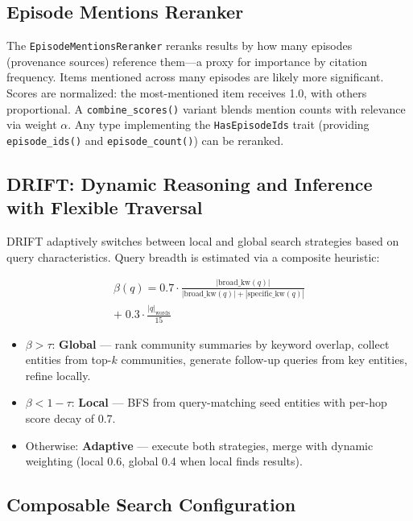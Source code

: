 \documentclass[11pt,a4paper,twocolumn]{article}
\begin{document}
\subsection{Episode Mentions Reranker}
\label{sec:epmention}

The \texttt{EpisodeMentionsReranker} reranks results by how many
episodes (provenance sources) reference them---a proxy for
importance by citation frequency. Items mentioned across many
episodes are likely more significant. Scores are normalized:
the most-mentioned item receives 1.0, with others proportional.
A \texttt{combine\_scores()} variant blends mention counts with
relevance via weight $\alpha$. Any type implementing the
\texttt{HasEpisodeIds} trait (providing \texttt{episode\_ids()}
and \texttt{episode\_count()}) can be reranked.

\subsection{DRIFT: Dynamic Reasoning and Inference with Flexible Traversal}

DRIFT adaptively switches between local and global search strategies
based on query characteristics. Query breadth is estimated via a
composite heuristic:

\begin{multline}
\beta(q) = 0.7 \cdot \frac{|\text{broad\_kw}(q)|}{|\text{broad\_kw}(q)|
  + |\text{specific\_kw}(q)|} \\
  + \; 0.3 \cdot \frac{|q|_{\text{words}}}{15}
\end{multline}

\begin{itemize}[leftmargin=*]
  \item $\beta > \tau$: \textbf{Global} --- rank community summaries
    by keyword overlap, collect entities from top-$k$ communities,
    generate follow-up queries from key entities, refine locally.
  \item $\beta < 1 - \tau$: \textbf{Local} --- BFS from query-matching
    seed entities with per-hop score decay of 0.7.
  \item Otherwise: \textbf{Adaptive} --- execute both strategies,
    merge with dynamic weighting (local 0.6, global 0.4 when local
    finds results).
\end{itemize}

\subsection{Composable Search Configuration}
\label{sec:searchconfig}
\end{document}
